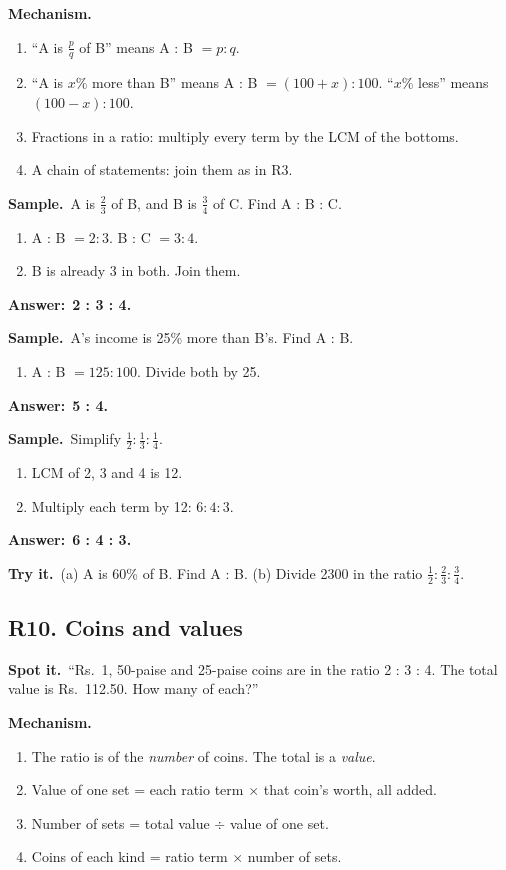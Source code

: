 \documentclass[11pt,a4paper]{article}
\let\oldsubsection\subsection
\renewcommand{\subsection}{\needspace{9\baselineskip}\oldsubsection}
\newcommand{\spot}{\textbf{\color{ember}Spot it.}\ }
\newcommand{\mech}{\textbf{\color{ember}Mechanism.}\ }
\newif\ifkeepsamp
\newcommand{\ans}[1]{\par\nopagebreak\noindent\textbf{\color{ember}Answer:}\ \textbf{#1}\par}
\newcommand{\samp}{\ifkeepsamp\needspace{4\baselineskip}\fi\textbf{\color{ember}Sample.}\ }
\newcommand{\tryit}[1]{\textbf{\color{ember}Try it.}\ #1}
\begin{document}
\mech
\begin{enumerate}
\item ``A is $\tfrac{p}{q}$ of B'' means A : B $= p : q$.
\item ``A is $x\%$ more than B'' means A : B $= (100 + x) : 100$. ``$x\%$ less'' means $(100 - x) : 100$.
\item Fractions in a ratio: multiply every term by the LCM of the bottoms.
\item A chain of statements: join them as in R3.
\end{enumerate}

\samp A is $\tfrac23$ of B, and B is $\tfrac34$ of C. Find A : B : C.
\begin{enumerate}
\item A : B $= 2 : 3$. B : C $= 3 : 4$.
\item B is already 3 in both. Join them.
\end{enumerate}
\ans{2 : 3 : 4.}

\samp A's income is 25\% more than B's. Find A : B.
\begin{enumerate}
\item A : B $= 125 : 100$. Divide both by 25.
\end{enumerate}
\ans{5 : 4.}

\samp Simplify $\tfrac12 : \tfrac13 : \tfrac14$.
\begin{enumerate}
\item LCM of 2, 3 and 4 is 12.
\item Multiply each term by 12: $6 : 4 : 3$.
\end{enumerate}
\ans{6 : 4 : 3.}

\tryit (a) A is 60\% of B. Find A : B. (b) Divide 2300 in the ratio $\tfrac12 : \tfrac23 : \tfrac34$.

\subsection{R10. Coins and values}
\spot ``Rs.\ 1, 50-paise and 25-paise coins are in the ratio 2 : 3 : 4. The total value is Rs.\ 112.50. How many of each?''

\mech
\begin{enumerate}
\item The ratio is of the \emph{number} of coins. The total is a \emph{value}.
\item Value of one set = each ratio term $\times$ that coin's worth, all added.
\item Number of sets = total value $\div$ value of one set.
\item Coins of each kind = ratio term $\times$ number of sets.
\end{enumerate}
\end{document}
